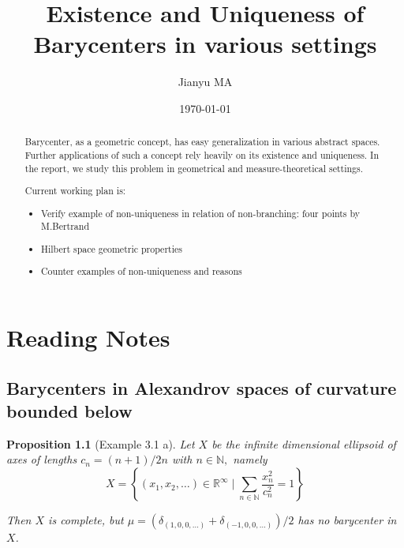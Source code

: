 \documentclass{report}
\newtheorem{prop}{Proposition}
\theoremstyle{remark}
\theoremstyle{definition}
\begin{document}
\author{Jianyu MA}
\date{\today}
\title{Existence and Uniqueness of Barycenters in various settings}
\maketitle

\begin{abstract}
	Barycenter, as a geometric concept, has easy generalization in various abstract spaces. Further applications of such a concept rely heavily on its existence and uniqueness. In the report, we study this problem in geometrical and measure-theoretical settings.

	Current working plan is:
	\begin{itemize}
		\item Verify example of non-uniqueness in relation of non-branching: four points by M.Bertrand
		\item Hilbert space geometric properties
		\item Counter examples of non-uniqueness and reasons
	\end{itemize}
\end{abstract}

\tableofcontents

\chapter{Reading Notes}
\section{Barycenters in Alexandrov spaces of curvature bounded below}
\begin{prop}[Example 3.1 a]
	Let \( X \) be the infinite dimensional ellipsoid of axes of lengths \( c _ { n } = ( n + 1 ) / 2 n \) with \( n \in \mathbb { N } , \) namely \[ X = \left\{ \left( x _ { 1 } , x _ { 2 } , \ldots \right) \in \mathbb { R } ^ { \infty } \mid \sum _ { n \in \mathbb { N } } \frac { x _ { n } ^ { 2 } } { c _ { n } ^ { 2 } } = 1 \right\} \]

	Then \( X \) is complete, but \( \mu = \left( \delta _ { ( 1,0,0 , \ldots ) } + \delta _ { ( - 1,0,0 , \ldots ) } \right) / 2 \) has no barycenter in \( X \).
\end{prop}
\end{document}
